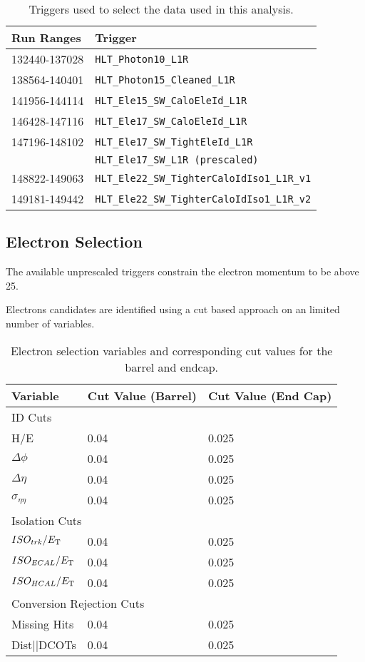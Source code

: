\begin{table}[htb]
  \centering
  \begin{tabular}{ l l }
    Run Ranges & Trigger \\
    \midrule
    132440-137028 & \verb=HLT_Photon10_L1R= \\
    138564-140401 & \verb=HLT_Photon15_Cleaned_L1R= \\
    141956-144114 & \verb=HLT_Ele15_SW_CaloEleId_L1R= \\
    146428-147116 & \verb=HLT_Ele17_SW_CaloEleId_L1R= \\
    147196-148102 & \verb=HLT_Ele17_SW_TightEleId_L1R= \\
                  & \verb=HLT_Ele17_SW_L1R (prescaled)= \\ 
    148822-149063 & \verb=HLT_Ele22_SW_TighterCaloIdIso1_L1R_v1= \\
    149181-149442 & \verb=HLT_Ele22_SW_TighterCaloIdIso1_L1R_v2= \\
  \end{tabular}
  \caption{Triggers used to select the data used in this analysis.}
  \label{asym36:triggers}
\end{table}

\subsection{Electron Selection}

The available unprescaled triggers constrain the electron momentum to be above
\unit{25}{\GeV}.

Electrons candidates are identified using a cut based approach on an limited
number of variables.

\begin{table}[htb]
  \centering
  \begin{tabular}{ l l l}
    Variable & Cut Value (Barrel) & Cut Value (End Cap) \\
    \midrule
    \multicolumn{3}{l}{ID Cuts} \\
    \midrule
    H/E                 & 0.04  & 0.025 \\
    $\Delta\phi$        & 0.04  & 0.025 \\
    $\Delta\eta$        & 0.04  & 0.025 \\
    $\sigma_{\eta\eta}$ & 0.04  & 0.025 \\
    \midrule
    \multicolumn{3}{l}{Isolation Cuts} \\
    \midrule
    $ISO_{trk}/ E_{\mathrm{T}} $   & 0.04  & 0.025 \\
    $ISO_{ECAL}/ E_{\mathrm{T}} $  & 0.04  & 0.025 \\
    $ISO_{HCAL}/ E_{\mathrm{T}} $  & 0.04  & 0.025 \\
    \midrule
    \multicolumn{3}{l}{Conversion Rejection Cuts} \\
    \midrule
    Missing Hits       & 0.04  & 0.025 \\
    Dist||DCOTs        & 0.04  & 0.025 \\
  \end{tabular}
  \caption{Electron selection variables and corresponding cut values for the
barrel and endcap.}
  \label{asym36:electronselection}
\end{table}

